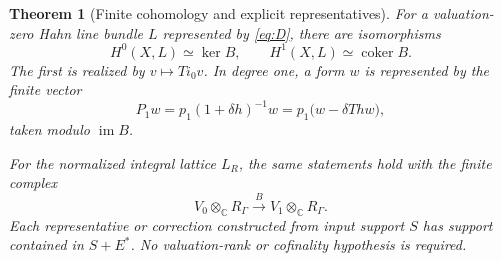 \documentclass[11pt,letterpaper]{article}
\numberwithin{equation}{section}
\newtheorem{theorem}{Theorem}[section]
\theoremstyle{definition}
\theoremstyle{remark}
\newcommand{\C}{\mathbb C}
\newcommand{\im}{\operatorname{im}}
\newcommand{\coker}{\operatorname{coker}}
\newcommand{\rg}{R_\Gamma}
\newcommand{\ot}{\otimes_{\C}}
\begin{document}
\begin{theorem}[Finite cohomology and explicit representatives]
\label{thm:finite}
For a valuation-zero Hahn line bundle $L$ represented by
\eqref{eq:D}, there are isomorphisms
\begin{equation}
 H^0(X,L)\simeq\ker B,\qquad H^1(X,L)\simeq\coker B.
 \label{eq:finitecohomology}
\end{equation}
The first is realized by $v\mapsto Ti_0v$. In degree one, a form $w$
is represented by the finite vector
\begin{equation}
 P_1w=p_1(1+\delta h)^{-1}w
      =p_1\bigl(w-\delta T h w\bigr),
 \label{eq:P1}
\end{equation}
taken modulo $\im B$.

For the normalized integral lattice $L_R$, the same statements hold
with the finite complex
\begin{equation}
 V_0\ot\rg\xrightarrow{B}V_1\ot\rg.
 \label{eq:integralcomplex}
\end{equation}
Each representative or correction constructed from input support $S$
has support contained in $S+E^*$. No valuation-rank or cofinality
hypothesis is required.
\end{theorem}
\end{document}
